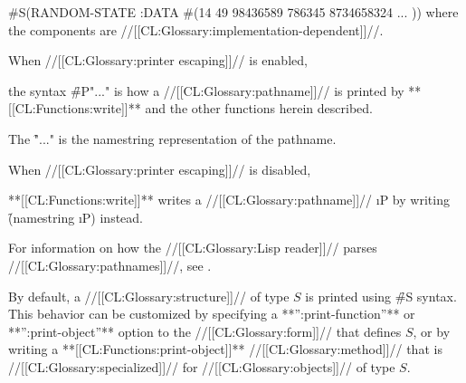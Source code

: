 \code
 #S(RANDOM-STATE :DATA #(14 49 98436589 786345 8734658324 ... ))
\endcode
where the components are //[[CL:Glossary:implementation-dependent]]//.

\endsubsubsection%


 

When //[[CL:Glossary:printer escaping]]// is enabled,

the syntax \f{\#P"..."} is how a
//[[CL:Glossary:pathname]]// is printed by **[[CL:Functions:write]]** and the other functions herein described.

The \f{"..."} is the namestring representation of the pathname.
 










When //[[CL:Glossary:printer escaping]]// is disabled,

**[[CL:Functions:write]]** writes a //[[CL:Glossary:pathname]]// \i{P}
by writing \f{(namestring \i{P})} instead.















For information on how the //[[CL:Glossary:Lisp reader]]// parses //[[CL:Glossary:pathnames]]//,
see \secref\SharpsignP.



\endsubsubsection%







By default, a //[[CL:Glossary:structure]]// of type $S$ is printed using \f{\#S} syntax.
This behavior can be customized by specifying a **'':print-function''** 
or **'':print-object''** option to the  //[[CL:Glossary:form]]// that defines $S$,
or by writing a **[[CL:Functions:print-object]]** //[[CL:Glossary:method]]// 
that is //[[CL:Glossary:specialized]]// for //[[CL:Glossary:objects]]// of type $S$.


